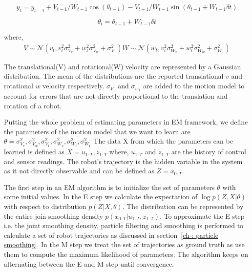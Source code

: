 \documentclass[12pt]{dalcsthesis}
\begin{document}
\begin{equation}
\label{eq:velocity motion model_y}
y_{t}=y_{t-1}+V_{t-1}/W_{t-1} \cos(\theta_{t-1})- V_{t-1}/W_{t-1} \sin(\theta_{t-1} + W_{t-1} \delta t)
\end{equation}

\begin{equation}
\label{eq:velocity motion model_theta}
\theta_{t}=\theta_{t-1}+ W_{t-1} \delta t
\end{equation}

where,
\begin{eqnarray}
V \sim \mathcal{N}(v_{t},v_{t}^{2}\sigma_{V_{v}}^{2}+w_{t}^{2}\sigma_{V_{w}}^{2}+\sigma_{V_{1}}^{2})
W \sim \mathcal{N}(w_{t},v_{t}^{2}\sigma_{W_{v}}^{2}+w_{t}^{2}\sigma_{W_{w}}^{2}+\sigma_{W_{1}}^{2})
\end{eqnarray}

The translational(V) and rotational(W) velocity are represented by a Gaussian distribution. The mean of the distributions are the reported translational $v$ and rotational $w$ velocity respectively. $\sigma_{V_{1}} $ and $\sigma_{w_{1}}$ are added to the motion model to account for errors that are not directly proportional to the translation and rotation of a robot.

Putting the whole problem of estimating parameters in EM framework, we define the parameters of the motion model that we want to learn are $\theta={\sigma_{V_{v}}^{2},\sigma_{V_{w}}^{2},\sigma_{V_{1}}^{2},\sigma_{W_{v}}^{2},\sigma_{W_{t}}^{2},\sigma_{W_{1}}^{2}}$
The data X from which the parameters can be learned is defined as $X={u_{1:T},z_{1:T}}$
where, $u_{1:T}$ and $z_{1:T}$ are the history of control and sensor readings. The robot's trajectory is the hidden variable in the system as it not directly observable and can be defined as $Z=x_{0:T}$.

The first step in an EM algorithm is to initialize the set of parameters $\theta$ with some initial values. In the E step we calculate the expectation of $\log p(Z,X|\theta)$ with respect to distribution $p(Z|X,\theta)$. The distribution can be represented by the entire join smoothing density $p(x_{0:T}|u_{1:T},z_{1:T})$. To approximate the E step i.e. the joint smoothing density, particle filtering and smoothing is performed to calculate a set of robot trajectories as discussed in section~\ref{ch-: particle smoothing}. In the M step we treat the set of trajectories as ground truth as use them to compute the maximum likelihood of parameters. The algorithm keeps on alternating between the E and M step until convergence. 
\end{document}
